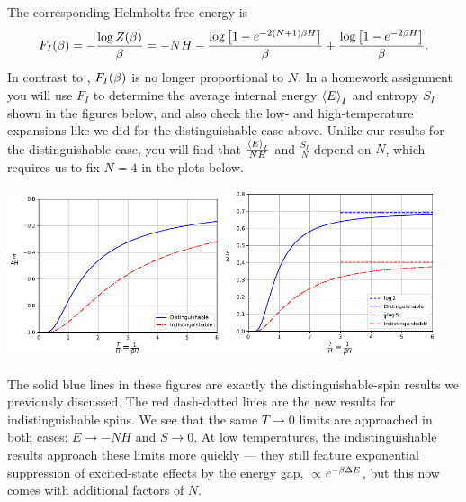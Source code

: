 The corresponding Helmholtz free energy is
\begin{equation}
  \label{eq:indist_Helm}
  F_I(\beta) = -\frac{\log Z(\beta)}{\beta} = -NH - \frac{\log\left[1 - e^{-2(N + 1) \beta H}\right]}{\beta} + \frac{\log\left[1 - e^{-2 \beta H}\right]}{\beta}.
\end{equation}
In contrast to , $F_I(\beta)$ is no longer proportional to $N$.
In a homework assignment you will use $F_I$ to determine the average internal energy $\left\langle E \right\rangle_I$ and entropy $S_I$ shown in the figures below, and also check the low- and high-temperature expansions like we did for the distinguishable case above.
Unlike our results for the distinguishable case, you will find that $\frac{\left\langle E \right\rangle_I}{NH}$ and $\frac{S_I}{N}$ depend on $N$, which requires us to fix $N = 4$ in the plots below.
\begin{center} %
  \includegraphics[width=0.475\textwidth]{figs/unit03_energies.pdf}\hfill \includegraphics[width=0.475\textwidth]{figs/unit03_entropies.pdf}
\end{center}

The solid blue lines in these figures are exactly the distinguishable-spin results we previously discussed.
The red dash-dotted lines are the new results for indistinguishable spins.
We see that the same $T \to 0$ limits are approached in both cases: $E \to -NH$ and $S \to 0$.
At low temperatures, the indistinguishable results approach these limits more quickly --- they still feature exponential suppression of excited-state effects by the energy gap, $\propto$$e^{-\beta \Delta E}$, but this now comes with additional factors of $N$.

